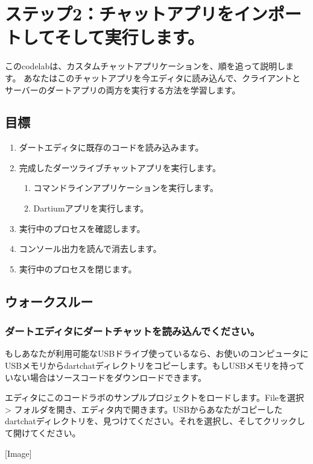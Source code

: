 \section{ステップ2：チャットアプリをインポートしてそして実行します。}

このcodelabは、カスタムチャットアプリケーションを、順を追って説明します。
あなたはこのチャットアプリを今エディタに読み込んで、クライアントとサーバーのダートアプリの両方を実行する方法を学習します。

\subsection{目標}

\begin{enumerate}
\item ダートエディタに既存のコードを読み込みます。
\item 完成したダーツライブチャットアプリを実行します。
\begin{enumerate}
\item コマンドラインアプリケーションを実行します。
\item Dartiumアプリを実行します。
\end{enumerate}
\item 実行中のプロセスを確認します。
\item コンソール出力を読んで消去します。
\item 実行中のプロセスを閉じます。
\end{enumerate}

\subsection{ウォークスルー}

\subsubsection{ダートエディタにダートチャットを読み込んでください。}

もしあなたが利用可能なUSBドライブ使っているなら、お使いのコンピュータにUSBメモリからdartchatディレクトリをコピーします。もしUSBメモリを持っていない場合はソースコードをダウンロードできます。

エディタにこのコードラボのサンプルプロジェクトをロードします。Fileを選択 > フォルダを開き、エディタ内で開きます。USBからあなたがコピーしたdartchatディレクトリを、見つけてください。それを選択し、そしてクリックして開けてください。

[Image]

